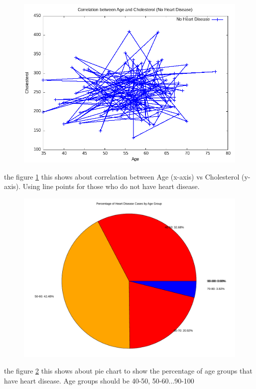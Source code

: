 \documentclass{article}
\begin{document}
	\begin{figure}[H]
	\includegraphics[width=\textwidth]{4.3.png}
	\label{fig:Age vs Cholesterol}
	\end{figure}
	the figure \ref{fig:Age vs Cholesterol} this shows about correlation between Age (x-axis) vs Cholesterol (y-axis). Using line points for those who do not have heart disease.
	
	\begin{figure}[H]
	\includegraphics[width=\textwidth]{4.4.pdf}
	\label{fig:piechart}
	\end{figure}
	the figure \ref{fig:piechart} this shows about pie chart to show the percentage of age groups that have heart disease. Age groups should be 40-50, 50-60...90-100
\end{document}
